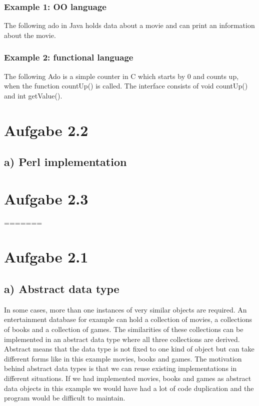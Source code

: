 \documentclass[a4paper,10pt]{scrartcl}[2003/01/01]
\begin{document}
\subsubsection*{Example 1: OO language}
The following ado in Java holds data about a movie and can print an information about the movie. 


\subsubsection*{Example 2: functional language}
The following Ado is a simple counter in C which starts by 0 and counts up, when the function countUp() is called. The interface consists of void countUp() and int getValue().



\section*{Aufgabe 2.2}
\subsection*{a) Perl implementation}



\section*{Aufgabe 2.3}


=======
	\maketitle
	
	\section*{Aufgabe 2.1}
	\subsection*{a) Abstract data type}
	In some cases, more than one instances of very similar objects are required. An  entertainment database for example can hold a collection of movies, a collections of books and a collection of games. The similarities of these collections can be implemented in an abstract data type where all three collections are derived. Abstract means that the data type is not fixed to one kind of object but can take different forms like in this example movies, books and games. The motivation behind abstract data types is that we can reuse existing implementations in different situations. If we had implemented movies, books and games as abstract data objects in this example we would have had a lot of code duplication and the program would be difficult to maintain.
	
\end{document}
